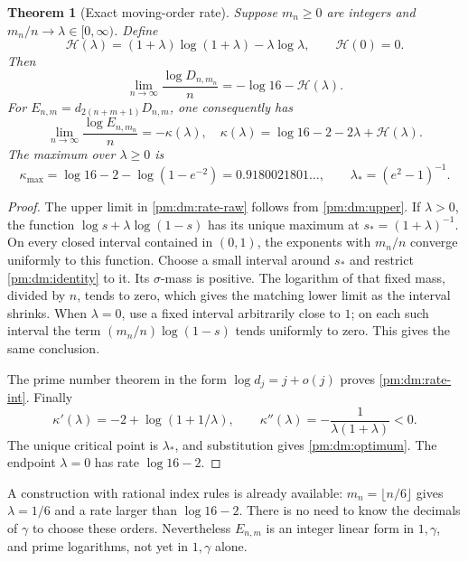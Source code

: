 \documentclass[11pt,a4paper]{article}
\newtheorem{theorem}{Theorem}[section]
\theoremstyle{definition}
\theoremstyle{remark}
\numberwithin{equation}{section}
\begin{document}
\begin{theorem}[Exact moving-order rate]\label{pm:dm:rate}
Suppose $m_n\ge0$ are integers and $m_n/n\to\lambda\in[0,\infty)$.
Define
\[
 \mathcal H(\lambda)=(1+\lambda)\log(1+\lambda)
                       -\lambda\log\lambda,\qquad \mathcal H(0)=0.
\]
Then
\begin{equation}\label{pm:dm:rate-raw}
 \lim_{n\to\infty}\frac{\log D_{n,m_n}}n
 =-\log16-\mathcal H(\lambda).
\end{equation}
For $E_{n,m}=d_{2(n+m+1)}D_{n,m}$, one consequently has
\begin{equation}\label{pm:dm:rate-int}
 \lim_{n\to\infty}\frac{\log E_{n,m_n}}n=-\kappa(\lambda),
 \quad \kappa(\lambda)=\log16-2-2\lambda+\mathcal H(\lambda).
\end{equation}
The maximum over $\lambda\ge0$ is
\begin{equation}\label{pm:dm:optimum}
 \kappa_{\max}=\log16-2-\log(1-e^{-2})=0.9180021801\ldots,
 \qquad \lambda_*=(e^2-1)^{-1}.
\end{equation}
\end{theorem}
\begin{proof}
The upper limit in \eqref{pm:dm:rate-raw} follows from \eqref{pm:dm:upper}.
If $\lambda>0$, the function
$\log s+\lambda\log(1-s)$ has its unique maximum at
$s_*=(1+\lambda)^{-1}$.  On every closed interval contained in $(0,1)$,
the exponents with $m_n/n$ converge uniformly to this function.  Choose a
small interval around $s_*$ and restrict \eqref{pm:dm:identity} to it.
Its $\sigma$-mass is positive.  The logarithm of that fixed mass, divided
by $n$, tends to zero, which gives the matching lower limit as the interval
shrinks.  When $\lambda=0$, use a fixed interval arbitrarily close to $1$;
on each such interval the term $(m_n/n)\log(1-s)$ tends uniformly to zero.
This gives the same conclusion.

The prime number theorem in the form $\log d_j=j+o(j)$ proves
\eqref{pm:dm:rate-int}.  Finally
\[
 \kappa'(\lambda)=-2+\log(1+1/\lambda),\qquad
 \kappa''(\lambda)=-\frac1{\lambda(1+\lambda)}<0.
\]
The unique critical point is $\lambda_*$, and substitution gives
\eqref{pm:dm:optimum}.  The endpoint $\lambda=0$ has rate $\log16-2$.
\end{proof}

A construction with rational index rules is already available:
$m_n=\lfloor n/6\rfloor$ gives $\lambda=1/6$ and a rate larger than
$\log16-2$.  There is no need to know the decimals of $\gamma$ to choose
these orders.  Nevertheless $E_{n,m}$ is an integer linear form in
$1,\gamma$, and prime logarithms, not yet in $1,\gamma$ alone.
\end{document}
